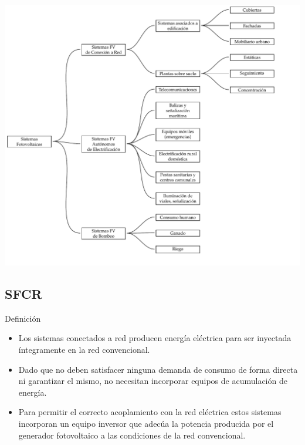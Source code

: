 \documentclass[xcolor={usenames,svgnames,dvipsnames}]{beamer}
\begin{document}
\begin{frame}[label={sec:orgd9aac36}]{}
\begin{center}
\includegraphics[width=.9\linewidth]{../figs/ClasificacionSistemas.pdf}
\end{center}
\end{frame}

\subsection{SFCR}
\label{sec:org60f0cab}

\begin{frame}[label={sec:org3721afa}]{Definición}
\begin{itemize}
\item Los sistemas conectados a red producen energía eléctrica para ser
inyectada íntegramente en la red convencional.

\item Dado que no deben satisfacer ninguna demanda de consumo de forma
directa ni garantizar el mismo, no necesitan incorporar equipos de
acumulación de energía.

\item Para permitir el correcto acoplamiento con la red eléctrica estos
sistemas incorporan un equipo inversor que adecúa la potencia
producida por el generador fotovoltaico a las condiciones de la red
convencional.
\end{itemize}
\end{frame}
\end{document}
